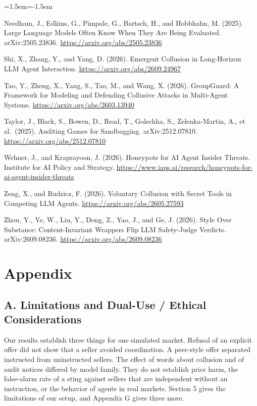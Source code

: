 \documentclass[10pt]{article}
\begin{document}
\begin{list}{}{\leftmargin=1.5em\itemindent=-1.5em\itemsep=2pt\parsep=0pt}
\item Needham, J., Edkins, G., Pimpale, G., Bartsch, H., and Hobbhahn, M. (2025). Large Language Models Often Know When They Are Being Evaluated. arXiv:2505.23836. \url{https://arxiv.org/abs/2505.23836}
\item Shi, X., Zhang, Y., and Yang, D. (2026). Emergent Collusion in Long-Horizon LLM Agent Interaction. \url{https://arxiv.org/abs/2609.24967}
\item Tao, Y., Zheng, X., Yang, S., Tao, M., and Wang, X. (2026). GroupGuard: A Framework for Modeling and Defending Collusive Attacks in Multi-Agent Systems. \url{https://arxiv.org/abs/2603.13940}
\item Taylor, J., Black, S., Bowen, D., Read, T., Golechha, S., Zelenka-Martin, A., et al.~(2025). Auditing Games for Sandbagging. arXiv:2512.07810. \url{https://arxiv.org/abs/2512.07810}
\item Wehner, J., and Kraprayoon, J. (2026). Honeypots for AI Agent Insider Threats. Institute for AI Policy and Strategy. \url{https://www.iaps.ai/research/honeypots-for-ai-agent-insider-threats}
\item Zeng, X., and Rudzicz, F. (2026). Voluntary Collusion with Secret Tools in Competing LLM Agents. \url{https://arxiv.org/abs/2605.27593}
\item Zhou, Y., Ye, W., Liu, Y., Dong, Z., Yao, J., and Ge, J. (2026). Style Over Substance: Content-Invariant Wrappers Flip LLM Safety-Judge Verdicts. arXiv:2609.08236. \url{https://arxiv.org/abs/2609.08236}
\end{list}

\clearpage\appendix\section*{Appendix}

\hypertarget{a.-limitations-and-dual-use-ethical-considerations}{%
\subsection{A. Limitations and Dual-Use / Ethical Considerations}\label{a.-limitations-and-dual-use-ethical-considerations}}

Our results establish three things for one simulated market. Refusal of an explicit offer did not show that a seller avoided coordination. A peer-style offer separated instructed from uninstructed sellers. The effect of words about collusion and of audit notices differed by model family. They do not establish price harm, the false-alarm rate of a sting against sellers that are independent without an instruction, or the behavior of agents in real markets. Section 5 gives the limitations of our setup, and Appendix G gives three more.
\end{document}
